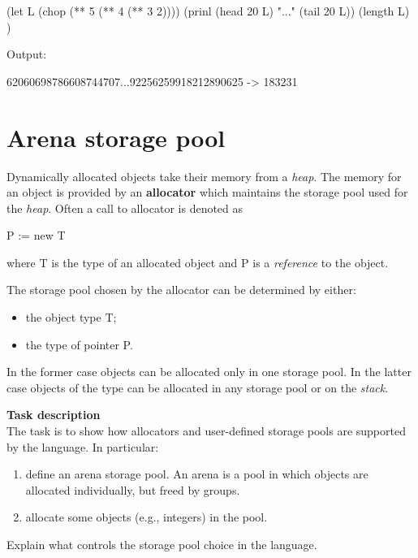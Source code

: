\begin{wideverbatim}

(let L (chop (** 5 (** 4 (** 3 2))))
   (prinl (head 20 L) "..." (tail 20 L))
   (length L) )

Output:

62060698786608744707...92256259918212890625
-> 183231

\end{wideverbatim}

\pagebreak{}
\section*{Arena storage pool}

Dynamically allocated objects take their memory from a \emph{heap}.
The memory for an object is provided by an \textbf{allocator} which
maintains the storage pool used for the \emph{heap}. Often a call to
allocator is denoted as

\begin{wideverbatim}
   P := new T
\end{wideverbatim}

where T is the type of an allocated object and P is a \emph{reference}
to the object.

The storage pool chosen by the allocator can be determined by either:

\begin{itemize}
\item
  the object type T;
\item
  the type of pointer P.
\end{itemize}

In the former case objects can be allocated only in one storage pool.
In the latter case objects of the type can be allocated in any storage
pool or on the \emph{stack}.

\textbf{Task description}\\ The task is to show how allocators and
user-defined storage pools are supported by the language. In particular:

\begin{enumerate}
\item
  define an arena storage pool. An arena is a pool in which objects are
  allocated individually, but freed by groups.
\item
  allocate some objects (e.g., integers) in the pool.
\end{enumerate}

Explain what controls the storage pool choice in the language.



